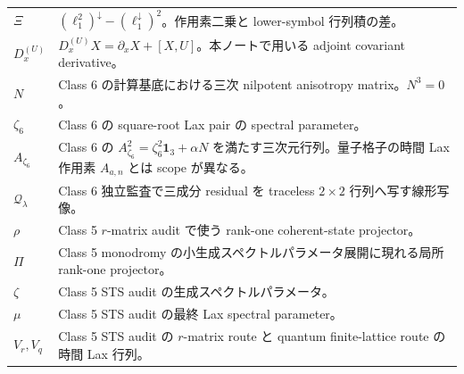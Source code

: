 \begin{longtable}{L{31mm}L{111mm}}
$\Xi$ & $(\ell_1^2)^\downarrow-(\ell_1^\downarrow)^2$。作用素二乗と lower-symbol 行列積の差。\\
$D_x^{(U)}$ & $D_x^{(U)}X=\partial_xX+[X,U]$。本ノートで用いる adjoint covariant derivative。\\
$N$ & Class 6 の計算基底における三次 nilpotent anisotropy matrix。$N^3=0$。\\
$\zeta_6$ & Class 6 の square-root Lax pair の spectral parameter。\\
$A_{\zeta_6}$ & Class 6 の $A_{\zeta_6}^2=\zeta_6^2\mathbf 1_3+\alpha N$ を満たす三次元行列。量子格子の時間 Lax 作用素 $A_{a,n}$ とは scope が異なる。\\
$\mathcal Q_\lambda$ & Class 6 独立監査で三成分 residual を traceless $2\times2$ 行列へ写す線形写像。\\
$\rho$ & Class 5 $r$-matrix audit で使う rank-one coherent-state projector。\\
$\Pi$ & Class 5 monodromy の小生成スペクトルパラメータ展開に現れる局所 rank-one projector。\\
$\zeta$ & Class 5 STS audit の生成スペクトルパラメータ。\\
$\mu$ & Class 5 STS audit の最終 Lax spectral parameter。\\
$V_r,V_q$ & Class 5 STS audit の $r$-matrix route と quantum finite-lattice route の時間 Lax 行列。\\
\end{longtable}
\normalsize

